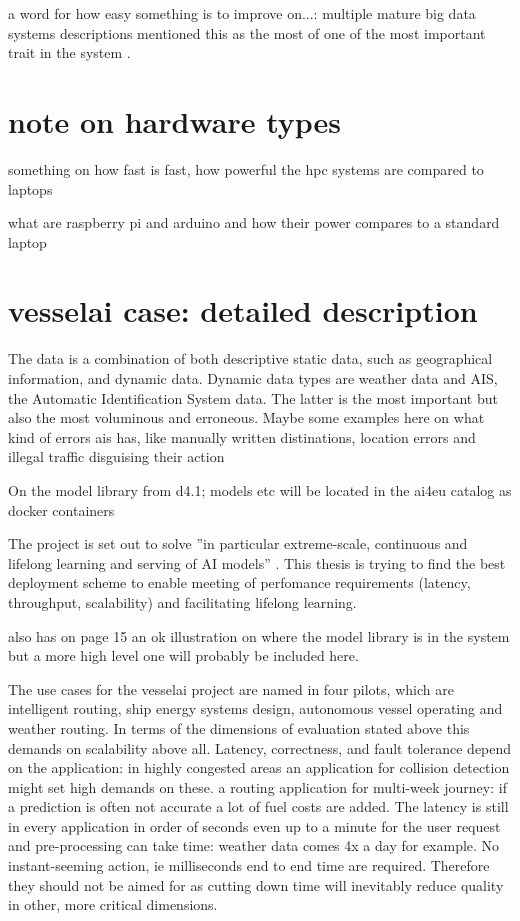 a word for how easy something is to improve on...: multiple mature big data systems descriptions mentioned this as the most of one of the most important trait in the system \cite{uber} \cite{facebook}.

\section{note on hardware types}

something on how fast is fast, how powerful the hpc systems are compared to laptops

what are raspberry pi and arduino and how their power compares to a standard laptop

\section{vesselai case: detailed description}

The data is a combination of both descriptive static data, such as geographical information, and dynamic data. Dynamic data types are weather data and AIS, the Automatic Identification System data. The latter is the most important but also the most voluminous and erroneous. Maybe some examples here on what kind of errors ais has, like manually written distinations, location errors and illegal traffic disguising their action

On the model library from d4.1; models etc will be located in the ai4eu catalog as docker containers \cite{D4.1}

The project is set out to solve ''in  particular  extreme-scale,  continuous  and  lifelong  learning  and  serving  of  AI  models'' \cite{D4.1}. This thesis is trying to find the best deployment scheme to enable meeting of perfomance requirements (latency, throughput, scalability) and facilitating lifelong learning.

\cite{D4.1} also has on page 15 an ok illustration on where the model library is in the system but a more high level one will probably be included here.

The use cases for the vesselai project are named in four pilots, which are intelligent routing, ship energy systems design, autonomous vessel operating and weather routing. In terms of the dimensions of evaluation stated above this demands on scalability above all. Latency, correctness, and fault tolerance depend on the application: in highly congested areas an application for collision detection might set high demands on these. a routing application for multi-week journey: if a prediction is often not accurate a lot of fuel costs are added. The latency is still in every application in order of seconds even up to a minute for the user request and pre-processing can take time: weather data comes 4x a day for example. No instant-seeming action, ie milliseconds end to end time are required. Therefore they should not be aimed for as cutting down time will inevitably reduce quality in other, more critical dimensions.

